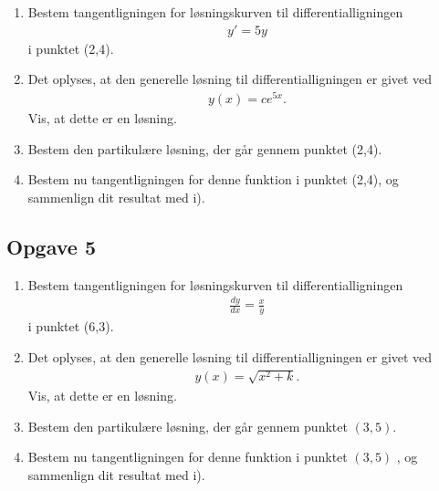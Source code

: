 \begin{enumerate}[label=\roman*)]
	\item Bestem tangentligningen for løsningskurven til differentialligningen
	\begin{align*}
		y' = 5y
	\end{align*}
	i punktet (2,4).
	\item Det oplyses, at den generelle løsning til differentialligningen er givet ved
	\begin{align*}
		y(x) = ce^{5x}.
	\end{align*}
	Vis, at dette er en løsning.
	\item Bestem den partikulære løsning, der går gennem punktet (2,4).
	\item Bestem nu tangentligningen for denne funktion i punktet (2,4), og sammenlign dit 
	resultat med i).
\end{enumerate}

\subsection*{Opgave 5}
\begin{enumerate}[label=\roman*)]
	\item Bestem tangentligningen for løsningskurven til differentialligningen
	\begin{align*}
		\frac{d y}{d x} = \frac{x}{y}
	\end{align*}
	i punktet (6,3).
	\item Det oplyses, at den generelle løsning til differentialligningen er givet ved
	\begin{align*}
		y(x) = \sqrt{x^2 + k}.
	\end{align*}
	Vis, at dette er en løsning.
	\item Bestem den partikulære løsning, der går gennem punktet $\left(3, 5 \right)$.
	\item Bestem nu tangentligningen for denne funktion i punktet $\left(3, 5 \right)$
	, og sammenlign dit 
	resultat med i).
\end{enumerate}
